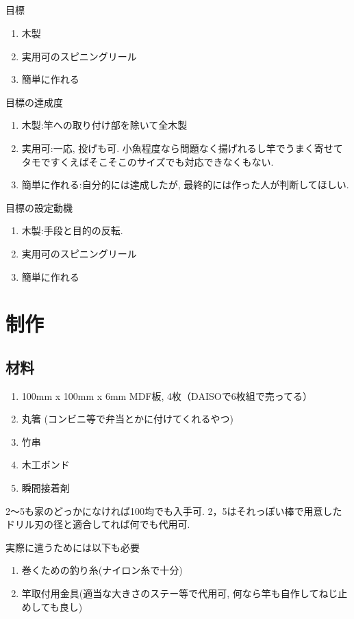 \documentclass{jarticle}
\begin{document}
\subsection{}
目標
\begin{enumerate}
\item 木製
\item 実用可のスピニングリール
\item 簡単に作れる
\end{enumerate}
目標の達成度
\begin{enumerate}
\item 木製:竿への取り付け部を除いて全木製
\item 実用可:一応, 投げも可. 小魚程度なら問題なく揚げれるし竿でうまく寄せてタモですくえばそこそこのサイズでも対応できなくもない.
\item 簡単に作れる:自分的には達成したが, 最終的には作った人が判断してほしい.
\end{enumerate}
目標の設定動機
\begin{enumerate}
\item 木製:手段と目的の反転. 
\item 実用可のスピニングリール
\item 簡単に作れる
\end{enumerate}


\section{制作}
\subsection{材料}
\begin{enumerate}
\item 100mm x 100mm x 6mm MDF板, 4枚（DAISOで6枚組で売ってる）
\item 丸箸 (コンビニ等で弁当とかに付けてくれるやつ)
\item 竹串
\item 木工ボンド
\item 瞬間接着剤
\end{enumerate}
2～5も家のどっかになければ100均でも入手可.
2，5はそれっぽい棒で用意したドリル刃の径と適合してれば何でも代用可.

実際に遣うためには以下も必要
\begin{enumerate}
\item 巻くための釣り糸(ナイロン糸で十分)
\item 竿取付用金具(適当な大きさのステー等で代用可, 何なら竿も自作してねじ止めしても良し)
\end{enumerate}
\end{document}
